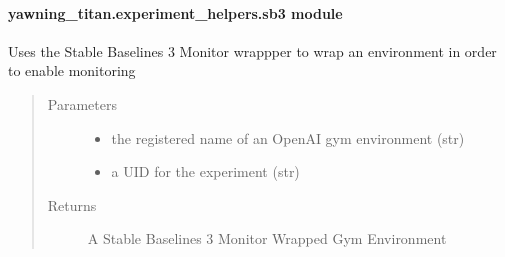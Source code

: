 \documentclass[letterpaper,10pt,english]{sphinxmanual}
\begin{document}
\paragraph{yawning\_titan.experiment\_helpers.sb3 module}
\label{\detokenize{source/yawning_titan.experiment_helpers:module-yawning_titan.experiment_helpers.sb3}}\label{\detokenize{source/yawning_titan.experiment_helpers:yawning-titan-experiment-helpers-sb3-module}}

\begin{fulllineitems}
\label{\detokenize{source/yawning_titan.experiment_helpers:yawning_titan.experiment_helpers.sb3.init_env}}
\sphinxAtStartPar
Uses the Stable Baselines 3 Monitor wrappper to wrap an
environment in order to enable monitoring
\begin{quote}\begin{description}
\item[{Parameters}] \leavevmode\begin{itemize}
\item {}
\sphinxAtStartPar
{} \textendash{} the registered name of an OpenAI gym environment (str)

\item {}
\sphinxAtStartPar
{} \textendash{} a UID for the experiment (str)

\end{itemize}

\item[{Returns}] \leavevmode
\sphinxAtStartPar
A Stable Baselines 3 Monitor Wrapped Gym Environment

\end{description}\end{quote}

\end{fulllineitems}
\end{document}
